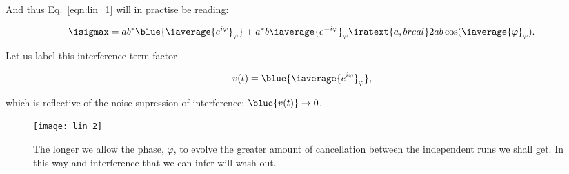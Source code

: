               \begin{framed}\noindent
                \noindent  And   thus  Eq.~\eqref{eqn:lin_1}   will  in
                practise be reading:

  \begin{equation}\label{eq:linrelax_10}
    \isigmax = ab^{*}\blue{\iaverage{e^{i\varphi}}_\varphi} + a^{*}b\iaverage{e^{-i\varphi}}_\varphi \iratext{a,b real} 2ab\cos(\iaverage{\varphi}_\varphi).
  \end{equation}
\end{framed}

\noindent Let us label this interference term factor

  \begin{equation}\label{eq:linrelax_11}
    v(t) = \blue{\iaverage{e^{i\varphi}}_\varphi},
  \end{equation}

  \noindent   which  is   reflective   of  the   noise  supression   of
  interference: $ \blue{v(t)} \rightarrow 0 $.

  \begin{figure}[ht]
    \centering \texttt{[image: lin\_2]}
    \caption{The  longer we  allow  the phase,  $ \varphi  $,  to evolve  the
      greater amount  of cancellation  between the independent  runs we
      shall get.  In  this way and interference that we  can infer will
      wash out.\label{fig:lin_2}}
  \end{figure}

